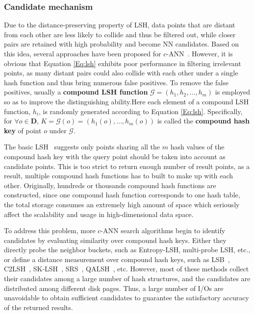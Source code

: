 \documentclass[twocolumn]{svjour3}          %
\begin{document}
\subsubsection{Candidate mechanism}
Due to the distance-preserving property of LSH, data points that are distant from each other are less likely to collide and thus be filtered out, while closer pairs are retained with high probability and become NN candidates. Based on this idea, several approaches have been proposed for $c$-ANN~\cite{Gionis1999,Datar2004,Lv2007,Tao2009LSB,Gan2012C2LSH}. However, it is obvious that Equation \ref{Eq:lsh} exhibits poor performance in filtering irrelevant points, as many distant pairs could also collide with each other under a single hash function and thus bring numerous false positives. To remove the false positives, usually a \textbf{compound LSH function} $\mathcal{G}=(h_1,h_2, \ldots, h_m)$ is employed so as to improve the distinguishing ability.Here each element of a compound LSH function, $h_i$, is randomly generated according to Equation \ref{Eq:lsh}. Specifically, for $\forall o\in \textbf{D}$, $K=\mathcal{G}(o)=(h_1(o), \ldots, h_m(o))$ is called the \textbf{compound hash key} of point $o$ under $\mathcal{G}$.

The basic LSH~\cite{Datar2004} suggests only points sharing all the $m$ hash values of the compound hash key with the query point should be taken into account as candidate points. This is too strict to return enough number of result points, as a result, multiple compound hash functions has to built to make up with each other. Originally, hundreds or thousands compound hash functions are constructed, since one compound hash function corresponds to one hash table, the total storage consumes an extremely high amount of space which seriously affect the scalability and usage in high-dimensional data space.

To address this problem, more $c$-ANN search algorithms begin to identify candidates by evaluating similarity over compound hash keys. Either they directly probe the neighbor buckets, such as Entropy-LSH, multi-probe LSH, etc., or define a distance measurement over compound hash keys, such as LSB~\cite{Tao2009LSB}, C2LSH~\cite{Gan2012C2LSH}, SK-LSH~\cite{Liu2014SKLSH}, SRS~\cite{Sun2014SRS}, QALSH~\cite{Huang2015QALSH}, etc. However, most of these methods collect their candidates among a large number of hash structures, and the candidates are distributed among different disk pages. Thus, a large number of I/Os are unavoidable to obtain sufficient candidates to guarantee the satisfactory accuracy of the returned results.
\end{document}
